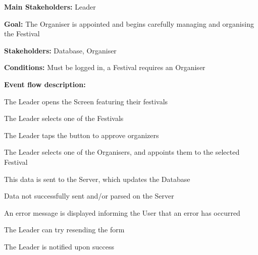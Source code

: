 				\noindent {}
				\begin{packed_item}
					\item \textbf{Main Stakeholders:} Leader
					\item \textbf{Goal:} The Organiser is appointed and begins carefully managing and organising the Festival
					\item \textbf{Stakeholders:} Database, Organiser
					\item \textbf{Conditions:} Must be logged in, a Festival requires an Organiser
					\item \textbf{Event flow description: }
					\begin{packed_enum}
						\item The Leader opens the Screen featuring their festivals
						\item The Leader selects one of the Festivals
						\item The Leader taps the button to approve organizers
						\item The Leader selects one of the Organisers, and appoints them to the selected Festival
						\item This data is sent to the Server, which updates the Database
					\end{packed_enum}
					
					\begin{packed_item}
						
						\item[4.a] Data not successfully sent and/or parsed on the Server
						\item[] \begin{packed_enum}
							\item An error message is displayed informing the User that an error has occurred
							\item The Leader can try resending the form
							\item The Leader is notified upon success
						\end{packed_enum}

					\end{packed_item}
				\end{packed_item}
			
